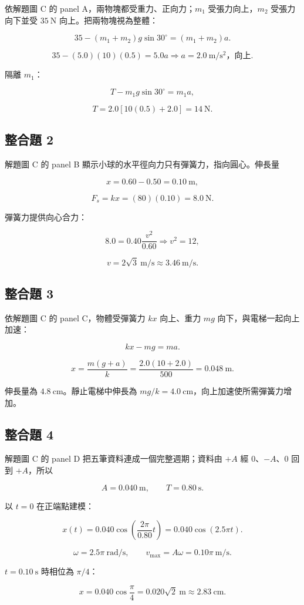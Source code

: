\documentclass[11pt,a4paper]{article}
\begin{document}
依解題圖 C 的 panel A，兩物塊都受重力、正向力；\(m_1\) 受張力向上，\(m_2\) 受張力向下並受 \(35\ \mathrm N\) 向上。把兩物塊視為整體：

\[
35-(m_1+m_2)g\sin30^\circ=(m_1+m_2)a.
\]

\[
35-(5.0)(10)(0.5)=5.0a
\Rightarrow a=2.0\ \mathrm{m/s^2}\text{，向上}.
\]

隔離 \(m_1\)：

\[
T-m_1g\sin30^\circ=m_1a,
\]

\[
T=2.0[10(0.5)+2.0]=14\ \mathrm N.
\]

\subsection{整合題 2}\label{ux6574ux5408ux984c-2}

解題圖 C 的 panel B 顯示小球的水平徑向力只有彈簧力，指向圓心。伸長量

\[
x=0.60-0.50=0.10\ \mathrm m,
\]

\[
F_s=kx=(80)(0.10)=8.0\ \mathrm N.
\]

彈簧力提供向心合力：

\[
8.0=0.40\frac{v^2}{0.60}
\Rightarrow v^2=12,
\]

\[
v=2\sqrt3\ \mathrm{m/s}\approx3.46\ \mathrm{m/s}.
\]

\subsection{整合題 3}\label{ux6574ux5408ux984c-3}

依解題圖 C 的 panel C，物體受彈簧力 \(kx\) 向上、重力 \(mg\) 向下，與電梯一起向上加速：

\[
kx-mg=ma.
\]

\[
x=\frac{m(g+a)}k
=\frac{2.0(10+2.0)}{500}
=0.048\ \mathrm m.
\]

伸長量為 \(4.8\ \mathrm{cm}\)。靜止電梯中伸長為 \(mg/k=4.0\ \mathrm{cm}\)，向上加速使所需彈簧力增加。

\subsection{整合題 4}\label{ux6574ux5408ux984c-4}

解題圖 C 的 panel D 把五筆資料連成一個完整週期；資料由 \(+A\) 經 0、\(-A\)、0 回到 \(+A\)，所以

\[
A=0.040\ \mathrm m,
\qquad
T=0.80\ \mathrm s.
\]

以 \(t=0\) 在正端點建模：

\[
x(t)=0.040\cos\left(\frac{2\pi}{0.80}t\right)
=0.040\cos(2.5\pi t).
\]

\[
\omega=2.5\pi\ \mathrm{rad/s},
\qquad
v_{\max}=A\omega=0.10\pi\ \mathrm{m/s}.
\]

\(t=0.10\ \mathrm s\) 時相位為 \(\pi/4\)：

\[
x=0.040\cos\frac\pi4
=0.020\sqrt2\ \mathrm m
\approx2.83\ \mathrm{cm}.
\]
\end{document}
